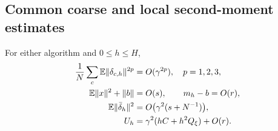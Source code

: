 \subsection{Common coarse and local second-moment estimates}
\label{app:common-coarse}

\begin{lemma}
\label{lem:common-coarse}
For either algorithm and $0\le h\le H$,
\begin{align}
 \frac1N\sum_c\mathbb{E}\|\delta_{c,h}\|^{2p}&=O(\gamma^{2p}),\quad p=1,2,3,
 \label{eq:A-delta-moments}\\
 \mathbb{E}\|x\|^2+\|b\|&=O(s),\qquad m_h-b=O(r),
 \label{eq:A-mean-bootstrap}\\
 \mathbb{E}\|\bar\delta_h\|^2&=O\bigl(\gamma^2(s+N^{-1})\bigr),
 \label{eq:A-deltabar}\\
 U_h&=\gamma^2(hC+h^2Q_\xi)+O(r).
 \label{eq:A-U-pre}
\end{align}
\end{lemma}

